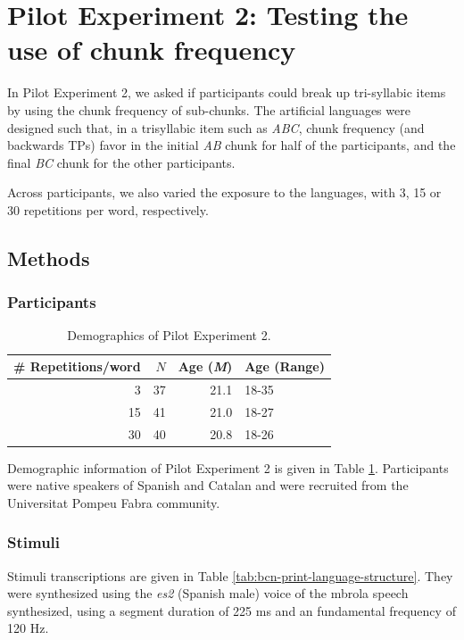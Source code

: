 \documentclass[]{article}
\newcommand{\M}{{\em M\/}}
\newcommand{\appsection}[1]{
  \clearpage
  \section{#1}
  \setcounter{subsection}{0}%
}
\begin{document}
\appsection{Pilot Experiment 2: Testing the use of chunk frequency}\label{app:pilot_bcn}

In Pilot Experiment 2, we asked if participants could break up tri-syllabic items by using the chunk frequency of sub-chunks. The artificial languages were designed such that, in a trisyllabic item such as \emph{ABC}, chunk frequency (and backwards TPs) favor in the initial \emph{AB} chunk for half of the participants, and the final \emph{BC} chunk for the other participants.

Across participants, we also varied the exposure to the languages, with 3, 15 or 30 repetitions per word, respectively.

\subsection{Methods}

\subsubsection{Participants}

\begin{table}[hpb]

\caption{\label{tab:bcn-demographics}Demographics of Pilot Experiment 2.}
\centering
\begin{tabular}[t]{rrrl}
\toprule
\# Repetitions/word & $N$ & Age (\M) & Age (Range)\\
\midrule
3 & 37 & 21.1 & 18-35\\
15 & 41 & 21.0 & 18-27\\
30 & 40 & 20.8 & 18-26\\
\bottomrule
\end{tabular}
\end{table}

Demographic information of Pilot Experiment 2 is given in Table \ref{tab:bcn-demographics}. Participants were native speakers of Spanish and Catalan and were recruited from the Universitat Pompeu Fabra community.

\subsubsection{Stimuli}

Stimuli transcriptions are given in Table \ref{tab:bcn-print-language-structure}. They were synthesized using the \emph{es2} (Spanish male) voice of the mbrola \citep{mbrola} speech synthesized, using a segment duration of 225 ms and an fundamental frequency of 120 Hz.
\end{document}
